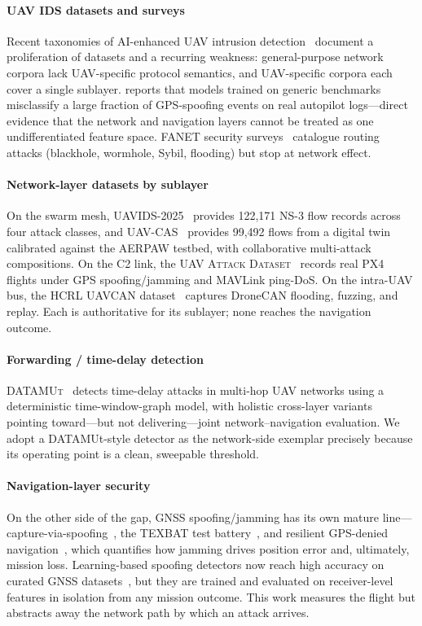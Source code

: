 \documentclass[conference]{IEEEtran}
\newcommand{\dataset}[1]{\textsc{#1}}
\begin{document}
\paragraph{UAV IDS datasets and surveys}
Recent taxonomies of AI-enhanced UAV intrusion detection~\cite{islam2025uavids}
document a proliferation of datasets and a recurring weakness: general-purpose
network corpora lack UAV-specific protocol semantics, and UAV-specific corpora
each cover a single sublayer. \cite{islam2025uavids} reports that models trained
on generic benchmarks misclassify a large fraction of GPS-spoofing events on real
autopilot logs---direct evidence that the network and navigation layers cannot be
treated as one undifferentiated feature space. FANET security
surveys~\cite{tsao2022survey,ceviz2024survey} catalogue routing attacks
(blackhole, wormhole, Sybil, flooding) but stop at network effect.

\paragraph{Network-layer datasets by sublayer}
On the swarm mesh, \dataset{UAVIDS-2025}~\cite{uavids2025,zeng2025uavids}
provides 122{,}171 NS-3 flow records across four attack classes, and
\dataset{UAV-CAS}~\cite{uavcas2026} provides 99{,}492 flows from a
digital twin calibrated against the AERPAW testbed, with collaborative
multi-attack compositions. On the C2 link, the \dataset{UAV Attack
Dataset}~\cite{whelan2020uav,whelan2020novelty} records real PX4 flights under
GPS spoofing/jamming and MAVLink ping-DoS. On the intra-UAV bus, the
\dataset{HCRL UAVCAN} dataset~\cite{hcrl_uavcan} captures DroneCAN flooding,
fuzzing, and replay. Each is authoritative for its sublayer; none reaches the
navigation outcome.

\paragraph{Forwarding / time-delay detection}
\dataset{DATAMUt}~\cite{datamut2026} detects time-delay attacks in multi-hop UAV
networks using a deterministic time-window-graph model, with holistic cross-layer
variants~\cite{hotd2023} pointing toward---but not delivering---joint
network--navigation evaluation. We adopt a DATAMUt-style detector as the
network-side exemplar precisely because its operating point is a clean,
sweepable threshold.

\paragraph{Navigation-layer security}
On the other side of the gap, GNSS spoofing/jamming has its own mature
line---capture-via-spoofing~\cite{kerns2014capture,humphreys2008assessing}, the
TEXBAT test battery~\cite{humphreys2012texbat}, and resilient GPS-denied
navigation~\cite{kassas2022jammer}, which quantifies how jamming drives
position error and, ultimately, mission loss. Learning-based spoofing detectors
now reach high accuracy on curated GNSS
datasets~\cite{aissou2024advml,panda2025drift}, but they are trained and
evaluated on receiver-level features in isolation from any mission outcome.
This work measures the flight but abstracts away the network path by which an
attack arrives.
\end{document}
